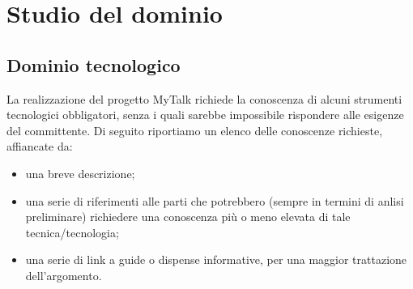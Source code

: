 \section{Studio del dominio}

\subsection{Dominio tecnologico}
La realizzazione del progetto MyTalk richiede la conoscenza di alcuni strumenti tecnologici obbligatori, senza i quali sarebbe impossibile rispondere alle esigenze del committente. Di seguito riportiamo un elenco delle conoscenze richieste, affiancate da:

\begin{itemize}
	\item una breve descrizione;
	\item una serie di riferimenti alle parti che potrebbero (sempre in termini di anlisi preliminare) richiedere una conoscenza più o meno elevata di tale tecnica/tecnologia;
	\item una serie di link a guide o dispense informative, per una maggior trattazione dell'argomento.
\end{itemize}

